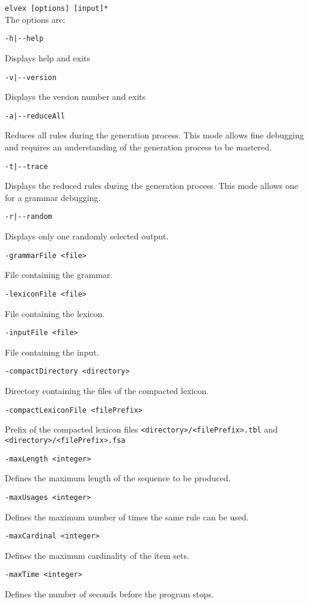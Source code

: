 \documentclass[11pt]{article}
\begin{document}
\noindent
\verb#elvex [options] [input]*#\\

The options are:

\begin{description}
\item \verb#-h|--help#

Displays help and exits

\item \verb#-v|--version#

Displays the version number and exits

\item \verb#-a|--reduceAll#

  Reduces all rules during the generation process. This mode
  allows fine debugging and requires an understanding of the
  generation process to be mastered.

\item \verb#-t|--trace#

  Displays the reduced rules during the generation process. This mode allows one for a
  grammar debugging.

\item \verb#-r|--random#
  
  Displays only one randomly selected output.
  
\item \verb#-grammarFile <file>#
  
  File containing the grammar.
  
\item \verb#-lexiconFile <file>#
  
  File containing the lexicon. 

\item \verb#-inputFile <file>#
  
  File containing the input. 
  
\item \verb#-compactDirectory <directory>#

  Directory containing the files of the compacted lexicon.

\item \verb#-compactLexiconFile <filePrefix>#

  Prefix of the compacted lexicon files
  \verb#<directory>/<filePrefix>.tbl# and
  \verb#<directory>/<filePrefix>.fsa#
  
\item \verb#-maxLength <integer>#

  Defines the maximum length of the sequence to be produced.

\item \verb#-maxUsages <integer>#

  Defines the maximum number of times the same rule can be used.

\item \verb#-maxCardinal <integer>#

  Defines the maximum cardinality of the item sets.

\item \verb#-maxTime <integer>#

  Defines the number of seconds before the program stops.

\end{description}
\end{document}
